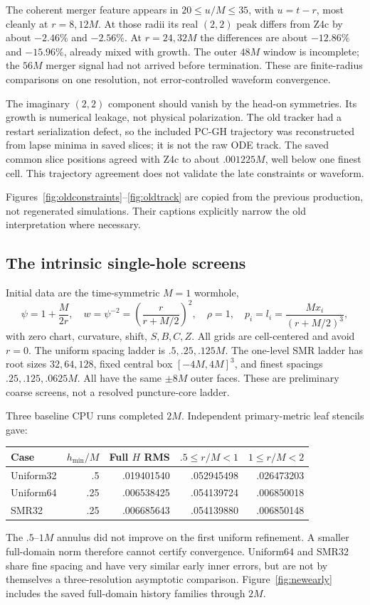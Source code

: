 \documentclass[11pt,letterpaper]{article}
\begin{document}
The coherent merger feature appears in $20\le u/M\le35$, with $u=t-r$, most cleanly at $r=8,12M$. At those radii its real $(2,2)$ peak differs from Z4c by about $-2.46\%$ and $-2.56\%$. At $r=24,32M$ the differences are about $-12.86\%$ and $-15.96\%$, already mixed with growth. The outer $48M$ window is incomplete; the $56M$ merger signal had not arrived before termination. These are finite-radius comparisons on one resolution, not error-controlled waveform convergence.

The imaginary $(2,2)$ component should vanish by the head-on symmetries. Its growth is numerical leakage, not physical polarization. The old tracker had a restart serialization defect, so the included PC-GH trajectory was reconstructed from lapse minima in saved slices; it is not the raw ODE track. The saved common slice positions agreed with Z4c to about $.001225M$, well below one finest cell. This trajectory agreement does not validate the late constraints or waveform.

Figures~\ref{fig:oldconstraints}--\ref{fig:oldtrack} are copied from the previous production, not regenerated simulations. Their captions explicitly narrow the old interpretation where necessary.

\subsection{The intrinsic single-hole screens}
Initial data are the time-symmetric $M=1$ wormhole,
\begin{equation}
\psi=1+\frac{M}{2r},\quad w=\psi^{-2}=\left(\frac r{r+M/2}\right)^2,
\quad\rho=1,\quad p_i=l_i=\frac{Mx_i}{(r+M/2)^3},
\end{equation}
with zero chart, curvature, shift, $S,B,C,Z$. All grids are cell-centered and avoid $r=0$. The uniform spacing ladder is $.5,.25,.125M$. The one-level SMR ladder has root sizes $32,64,128$, fixed central box $[-4M,4M]^3$, and finest spacings $.25,.125,.0625M$. All have the same $\pm8M$ outer faces. These are preliminary coarse screens, not a resolved puncture-core ladder.

Three baseline CPU runs completed $2M$. Independent primary-metric leaf stencils gave:
\begin{center}\small\begin{tabular}{lrrrr}\toprule
Case & $h_{\min}/M$ & Full $H$ RMS & $.5\le r/M<1$ & $1\le r/M<2$\\\midrule
Uniform32 & .5 & .019401540 & .052945498 & .026473203\\
Uniform64 & .25 & .006538425 & .054139724 & .006850018\\
SMR32 & .25 & .006685643 & .054139880 & .006850148\\\bottomrule
\end{tabular}\end{center}
The $.5$--$1M$ annulus did not improve on the first uniform refinement. A smaller full-domain norm therefore cannot certify convergence. Uniform64 and SMR32 share fine spacing and have very similar early inner errors, but are not by themselves a three-resolution asymptotic comparison. Figure~\ref{fig:newearly} includes the saved full-domain history families through $2M$.
\end{document}
